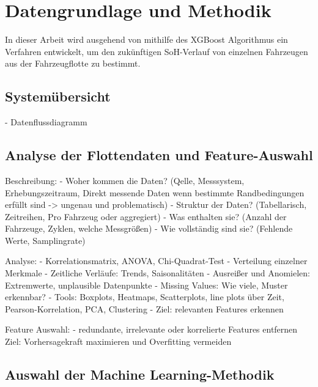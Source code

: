 
\chapter{Datengrundlage und Methodik}

In dieser Arbeit wird ausgehend von \cite{gradientBoostingRegressionTree} mithilfe des \ac{XGBoost} Algorithmus ein Verfahren entwickelt, um den zukünftigen \acs{SoH}-Verlauf von einzelnen Fahrzeugen aus der Fahrzeugflotte zu bestimmt.

\section{Systemübersicht}

- Datenflussdiagramm

\section{Analyse der Flottendaten und Feature-Auswahl}

Beschreibung:
- Woher kommen die Daten? (Qelle, Messsystem, Erhebungszeitraum, Direkt messende Daten wenn bestimmte Randbedingungen erfüllt sind -> ungenau und problematisch)
- Struktur der Daten? (Tabellarisch, Zeitreihen, Pro Fahrzeug oder aggregiert)
- Was enthalten sie? (Anzahl der Fahrzeuge, Zyklen, welche Messgrößen)
- Wie vollständig sind sie? (Fehlende Werte, Samplingrate)

Analyse:
- Korrelationsmatrix, ANOVA, Chi-Quadrat-Test
- Verteilung einzelner Merkmale
- Zeitliche Verläufe: Trends, Saisonalitäten
- Ausreißer und Anomielen: Extremwerte, unplausible Datenpunkte
- Missing Values: Wie viele, Muster erkennbar?
- Tools: Boxplots, Heatmaps, Scatterplots, line plots über Zeit, Pearson-Korrelation, PCA, Clustering
- Ziel: relevanten Features erkennen

Feature Auswahl:
- redundante, irrelevante oder korrelierte Features entfernen
Ziel: Vorhersagekraft maximieren und Overfitting vermeiden

\section{Auswahl der Machine Learning-Methodik}